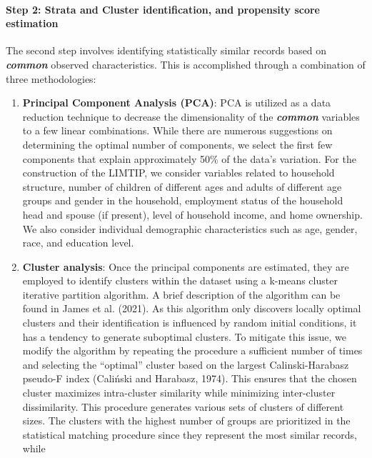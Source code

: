 \documentclass[
  11pt,
]{article}
\let\oldparagraph\paragraph
\renewcommand{\paragraph}[1]{\oldparagraph{#1}\mbox{}}
\begin{document}
\paragraph{Step 2: Strata and Cluster identification, and propensity
score
estimation}\label{step-2-strata-and-cluster-identification-and-propensity-score-estimation}

The second step involves identifying statistically similar records based
on \textbf{\emph{common}} observed characteristics. This is accomplished
through a combination of three methodologies:

\begin{enumerate}
\def\labelenumi{\arabic{enumi}.}
\item
  \textbf{Principal Component Analysis (PCA)}: PCA is utilized as a data
  reduction technique to decrease the dimensionality of the
  \textbf{\emph{common}} variables to a few linear combinations. While
  there are numerous suggestions on determining the optimal number of
  components, we select the first few components that explain
  approximately 50\% of the data's variation. For the construction of
  the LIMTIP, we consider variables related to household structure,
  number of children of different ages and adults of different age
  groups and gender in the household, employment status of the household
  head and spouse (if present), level of household income, and home
  ownership. We also consider individual demographic characteristics
  such as age, gender, race, and education level.
\item
  \textbf{Cluster analysis}: Once the principal components are
  estimated, they are employed to identify clusters within the dataset
  using a k-means cluster iterative partition algorithm. A brief
  description of the algorithm can be found in James et al. (2021). As
  this algorithm only discovers locally optimal clusters and their
  identification is influenced by random initial conditions, it has a
  tendency to generate suboptimal clusters. To mitigate this issue, we
  modify the algorithm by repeating the procedure a sufficient number of
  times and selecting the ``optimal'' cluster based on the largest
  Calinski-Harabasz pseudo-F index (Caliński and Harabasz, 1974). This
  ensures that the chosen cluster maximizes intra-cluster similarity
  while minimizing inter-cluster dissimilarity. This procedure generates
  various sets of clusters of different sizes. The clusters with the
  highest number of groups are prioritized in the statistical matching
  procedure since they represent the most similar records, while

\end{enumerate}
\end{document}
